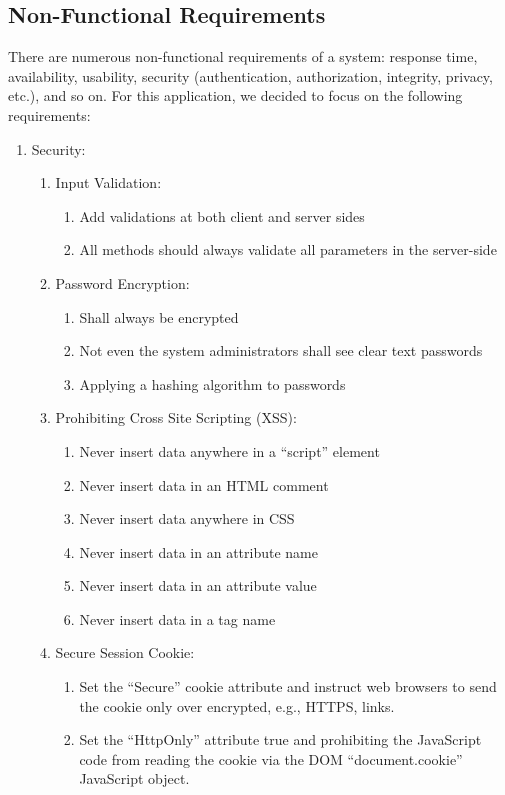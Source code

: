 \subsection{Non-Functional Requirements}
There are numerous non-functional requirements of a system: response time, availability, usability, security (authentication, authorization, integrity, privacy, etc.), and so on. For this application, we decided to focus on the following requirements:
\begin{enumerate}
  \item Security:
  \begin{enumerate}
    \item Input Validation:
    \begin{enumerate}
      \item Add validations at both client and server sides
      \item All methods should always validate all parameters in the server-side
    \end{enumerate}
    \item Password Encryption:
    \begin{enumerate}
      \item Shall always be encrypted
      \item Not even the system administrators shall see clear text passwords
      \item Applying a hashing algorithm to passwords
    \end{enumerate}
    \item Prohibiting Cross Site Scripting (XSS):
    \begin{enumerate}
      \item Never insert data anywhere in a ``script'' element
      \item Never insert data in an HTML comment
      \item Never insert data anywhere in CSS
      \item Never insert data in an attribute name
      \item Never insert data in an attribute value
      \item Never insert data in a tag name
    \end{enumerate}
    \item Secure Session Cookie:
    \begin{enumerate}
      \item Set the ``Secure'' cookie attribute and instruct web browsers to send the cookie only over encrypted, e.g., HTTPS, links.
      \item Set the ``HttpOnly'' attribute true and prohibiting the JavaScript code from reading the cookie via the DOM ``document.cookie'' JavaScript object.

\end{enumerate}
\end{enumerate}
\end{enumerate}
